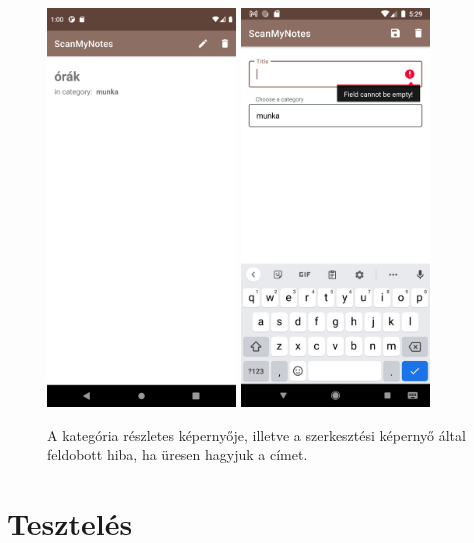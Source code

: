 \begin{figure}[!ht]
	\centering
	\includegraphics[width=50mm, keepaspectratio]{figures/category_view.png}
	\includegraphics[width=50mm, keepaspectratio]{figures/category_edit_error.png}
	\caption{A kategória részletes képernyője, illetve a szerkesztési képernyő által feldobott hiba, ha üresen hagyjuk a címet.}
	\label{fig:CategoryDetailsScreen}
\end{figure}

\section{Tesztelés}